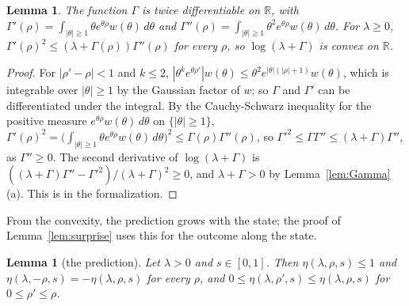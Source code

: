 \documentclass[12pt]{amsart}
\newtheorem{lemma}[theorem]{Lemma}
\theoremstyle{definition}
\numberwithin{equation}{section}
\newcommand{\R}{\mathbb{R}}
\newcommand{\leanmap}[1]{\ignorespaces}
\newcommand{\mapnote}[1]{\ignorespaces}
\begin{document}
\begin{lemma}\label{lem:convex}
\leanmap{RegretKappa.UnknownBT.UB.convexOn_log_G, RegretKappa.UnknownBT.UB.hasDerivAt_G,
  RegretKappa.UnknownBT.UB.hasDerivAt_G1, RegretKappa.UnknownBT.UB.disc_G}
\mapnote{Lean proves it for $\Gamma/2$, written with $\cosh$ and $\sinh$ over $\theta\ge1$.}
The function $\Gamma$ is twice differentiable on $\R$, with $\Gamma'(\rho)=\int_{|\theta|\ge1}\theta e^{\theta\rho}w(\theta)\,d\theta$ and $\Gamma''(\rho)=\int_{|\theta|\ge1}\theta^2e^{\theta\rho}w(\theta)\,d\theta$. For $\lambda\ge0$, $\Gamma'(\rho)^2\le(\lambda+\Gamma(\rho))\Gamma''(\rho)$ for every $\rho$, so $\log(\lambda+\Gamma)$ is convex on $\R$.
\end{lemma}

\begin{proof}
For $|\rho'-\rho|<1$ and $k\le2$, $|\theta^ke^{\theta\rho'}|w(\theta)\le\theta^2e^{|\theta|(|\rho|+1)}w(\theta)$, which is integrable over $|\theta|\ge1$ by the Gaussian factor of $w$; so $\Gamma$ and $\Gamma'$ can be differentiated under the integral. By the Cauchy-Schwarz inequality for the positive measure $e^{\theta\rho}w(\theta)\,d\theta$ on $\{|\theta|\ge1\}$, $\Gamma'(\rho)^2=\bigl(\int_{|\theta|\ge1}\theta e^{\theta\rho}w(\theta)\,d\theta\bigr)^2\le\Gamma(\rho)\Gamma''(\rho)$, so $\Gamma'^2\le\Gamma\Gamma''\le(\lambda+\Gamma)\Gamma''$, as $\Gamma''\ge0$. The second derivative of $\log(\lambda+\Gamma)$ is $((\lambda+\Gamma)\Gamma''-\Gamma'^2)/(\lambda+\Gamma)^2\ge0$, and $\lambda+\Gamma>0$ by Lemma~\ref{lem:Gamma}(a). This is  in the formalization.
\end{proof}

From the convexity, the prediction grows with the state; the proof of Lemma~\ref{lem:surprise} uses this for the outcome along the state.

\begin{lemma}[the prediction]\label{lem:eta}
\leanmap{RegretKappa.UnknownBT.UB.eta_mono, RegretKappa.UnknownBT.UB.eta_le_one,
  RegretKappa.UnknownBT.UB.eta_neg_left, RegretKappa.UnknownBT.UB.eta_nonneg}
\mapnote{Lean states it for the prediction as a function of the centre $\rho c$ and of $\sigma$, in the normalization $\Gamma/2$.}
Let $\lambda>0$ and $s\in[0,1]$. Then $\eta(\lambda,\rho,s)\le1$ and $\eta(\lambda,-\rho,s)=-\eta(\lambda,\rho,s)$ for every $\rho$, and $0\le\eta(\lambda,\rho',s)\le\eta(\lambda,\rho,s)$ for $0\le\rho'\le\rho$.
\end{lemma}
\end{document}
